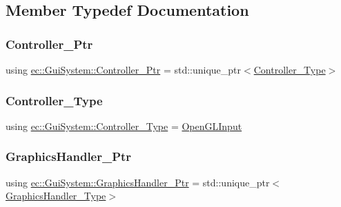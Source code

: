 \subsection{Member Typedef Documentation}
\mbox{\label{classec_1_1_gui_system_acee0577f0fa43e3903e127a36c44909d}} 
\subsubsection{\texorpdfstring{Controller\+\_\+\+Ptr}{Controller\_Ptr}}
{\footnotesize\ttfamily using \mbox{\hyperlink{classec_1_1_gui_system_acee0577f0fa43e3903e127a36c44909d}{ec\+::\+Gui\+System\+::\+Controller\+\_\+\+Ptr}} =  std\+::unique\+\_\+ptr$<$\mbox{\hyperlink{classec_1_1_gui_system_a06ff8d5daa43acea2e7ff43964bb14dd}{Controller\+\_\+\+Type}}$>$}

\mbox{\label{classec_1_1_gui_system_a06ff8d5daa43acea2e7ff43964bb14dd}} 
\subsubsection{\texorpdfstring{Controller\+\_\+\+Type}{Controller\_Type}}
{\footnotesize\ttfamily using \mbox{\hyperlink{classec_1_1_gui_system_a06ff8d5daa43acea2e7ff43964bb14dd}{ec\+::\+Gui\+System\+::\+Controller\+\_\+\+Type}} =  \mbox{\hyperlink{classec_1_1_open_g_l_input}{Open\+G\+L\+Input}}}

\mbox{\label{classec_1_1_gui_system_ae77a3a2d795b58a982e181b2197ba6fa}} 
\subsubsection{\texorpdfstring{Graphics\+Handler\+\_\+\+Ptr}{GraphicsHandler\_Ptr}}
{\footnotesize\ttfamily using \mbox{\hyperlink{classec_1_1_gui_system_ae77a3a2d795b58a982e181b2197ba6fa}{ec\+::\+Gui\+System\+::\+Graphics\+Handler\+\_\+\+Ptr}} =  std\+::unique\+\_\+ptr$<$\mbox{\hyperlink{classec_1_1_gui_system_ace2e875c44326f620358ce6b1dfc3bc7}{Graphics\+Handler\+\_\+\+Type}}$>$}

